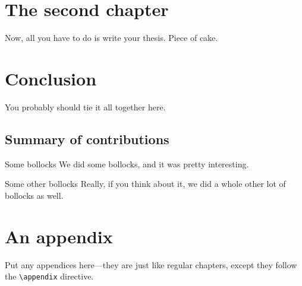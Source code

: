 \documentclass[12pt,xetex]{scrbook}
\begin{document}
\begin{onehalfspace}
\chapter{The second chapter}
\label{chap:second-chapter}

Now, all you have to do is write your thesis.  Piece of cake.


\chapter{Conclusion}
\label{chap:conclusion}

You probably should tie it all together here.

\section{Summary of contributions}
\label{sec:summary-of-contributions}

\begin{headinglist}
\item[Some bollocks]
  We did some bollocks, and it was pretty interesting.
\item[Some other bollocks] 
  Really, if you think about it, we did a whole other lot of bollocks
  as well.
\end{headinglist}


\appendix

\chapter{An appendix}
\label{chap:an-appendix}

Put any appendices here---they are just like regular chapters, except
they follow the \texttt{\textbackslash{}appendix} directive.

\end{onehalfspace}

\backmatter


\printbibliography[title=References,heading=bibintoc]
\end{document}
